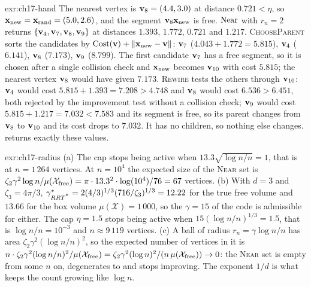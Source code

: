 
\begin{solution}{exr:ch17-hand}
The nearest vertex is $\mathbf{v}_8=(4.4,3.0)$ at distance $0.721<\eta$, so $\mathbf{x}_{\mathrm{new}}=\mathbf{x}_{\mathrm{rand}}=(5.0,2.6)$, and the segment $\mathbf{v}_8\mathbf{x}_{\mathrm{new}}$ is free. $\operatorname{Near}$ with $r_n=2$ returns $\left\{ \mathbf{v}_4,\mathbf{v}_7,\mathbf{v}_8,\mathbf{v}_9 \right\}$ at distances $1.393$, $1.772$, $0.721$ and $1.217$. \textsc{ChooseParent} sorts the candidates by $\mathrm{Cost}(\mathbf{v})+\left\lVert \mathbf{x}_{\mathrm{new}}-\mathbf{v} \right\rVert$: $\mathbf{v}_7$ ($4.043+1.772=5.815$), $\mathbf{v}_4$ ($6.141$), $\mathbf{v}_8$ ($7.173$), $\mathbf{v}_9$ ($8.799$). The first candidate $\mathbf{v}_7$ has a free segment, so it is chosen after a single collision check and $\mathbf{x}_{\mathrm{new}}$ becomes $\mathbf{v}_{10}$ with cost $5.815$; the nearest vertex $\mathbf{v}_8$ would have given $7.173$. \textsc{Rewire} tests the others through $\mathbf{v}_{10}$: $\mathbf{v}_4$ would cost $5.815+1.393=7.208>4.748$ and $\mathbf{v}_8$ would cost $6.536>6.451$, both rejected by the improvement test without a collision check; $\mathbf{v}_9$ would cost $5.815+1.217=7.032<7.583$ and its segment is free, so its parent changes from $\mathbf{v}_8$ to $\mathbf{v}_{10}$ and its cost drops to $7.032$. It has no children, so nothing else changes.  returns exactly these values.
\end{solution}

\begin{solution}{exr:ch17-radius}
(a) The cap stops being active when $13.3\sqrt{\log n/n}=1$, that is at
$n=1\,264$ vertices. At $n=10^4$ the expected size of the \textsc{Near} set
is $\zeta_2\gamma^2\log n/\mu(\mathcal{X}_{\mathrm{free}})=\pi\cdot13.3^2\cdot\log(10^4)/76=67$
vertices. (b) With $d=3$ and $\zeta_3=4\pi/3$,
$\gamma^*_{RRT\textsuperscript{*}}=2(4/3)^{1/3}(716/\zeta_3)^{1/3}=12.22$ for the true free
volume and $13.66$ for the box volume $\mu(\mathcal{X})=1\,000$, so the
$\gamma=15$ of the code is admissible for either. The cap $\eta=1.5$ stops
being active when $15(\log n/n)^{1/3}=1.5$, that is $\log n/n=10^{-3}$ and
$n\approx9\,119$ vertices. (c) A ball of radius $r_n=\gamma\log n/n$ has area
$\zeta_2\gamma^2(\log n/n)^2$, so the expected number of vertices in it is
$n\cdot\zeta_2\gamma^2(\log n/n)^2/\mu(\mathcal{X}_{\mathrm{free}})=\zeta_2\gamma^2(\log n)^2/(n\,\mu(\mathcal{X}_{\mathrm{free}}))\to0$:
the \textsc{Near} set is empty from some $n$ on, \rrtstar degenerates to
\rrt and stops improving. The exponent $1/d$ is what keeps the count
growing like $\log n$.
\end{solution}

